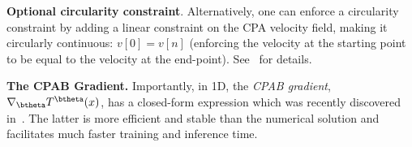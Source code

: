 \textbf{Optional circularity constraint}. Alternatively, one can enforce a circularity constraint by adding a linear constraint on the CPA velocity field,
making it circularly continuous: $v[0]=v[n]$ (\ie enforcing the velocity at the starting point to be equal to the
velocity at the end-point). See~\cite{kaufman:icip:2021:cyclic} for details.

\textbf{The CPAB Gradient.}
Importantly, in 1D, the \emph{CPAB gradient},
$\nabla_\btheta T^\btheta( x)$, has a closed-form expression which was recently discovered in~\cite{Martinez:ICML:2022:closed}.
The latter is more efficient and stable than the numerical solution and facilitates much faster training and inference time.



